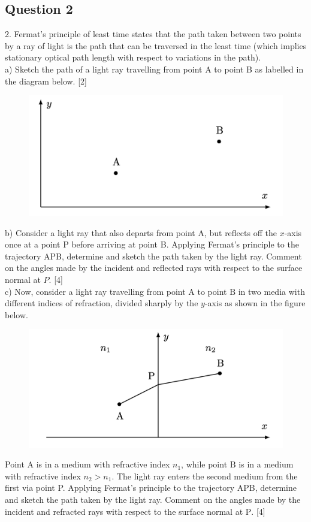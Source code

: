 \documentclass{article}
\begin{document}
\subsection{Question 2}
2. Fermat's principle of least time states that the path taken between two points by a ray of light is the path that can be traversed in the least time (which implies stationary optical path length with respect to variations in the path). \\
a) Sketch the path of a light ray travelling from point A to point B as labelled in the diagram below. [2] \\

\begin{figure}
	\centering
	\includegraphics[width=0.5\linewidth]{spho_book_TYS_images/2017q2.png}
	\caption{}
\end{figure}
b) Consider a light ray that also departs from point $\mathrm{A}$, but reflects off the $x$-axis once at a point P before arriving at point B. Applying Fermat's principle to the trajectory APB, determine and sketch the path taken by the light ray. Comment on the angles made by the incident and reflected rays with respect to the surface normal at $P$. [4] \\
c) Now, consider a light ray travelling from point $\mathrm{A}$ to point $\mathrm{B}$ in two media with different indices of refraction, divided sharply by the $y$-axis as shown in the figure below. \\
\begin{figure}
	\centering
	\includegraphics[width=0.5\linewidth]{spho_book_TYS_images/2017q2_2.png}
	\caption{}
\end{figure}
Point $\mathrm{A}$ is in a medium with refractive index $n_{1}$, while point $\mathrm{B}$ is in a medium with refractive index $n_{2}>n_{1}$. The light ray enters the second medium from the first via point P. Applying Fermat's principle to the trajectory APB, determine and sketch the path taken by the light ray. Comment on the angles made by the incident and refracted rays with respect to the surface normal at $\mathrm{P}$. [4]
\end{document}
